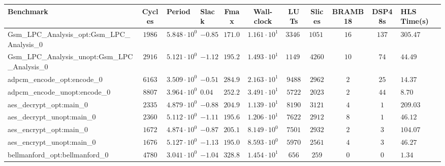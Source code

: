 \begin{tabular}{|l|c|HHc|c|c|c|c|cH|}
\hline
Benchmark                                       & Cycles       & Period                 & Slack     & Fmax       & Wall-clock              & LUTs       & Slices    & BRAMB18 & DSP48s  & HLS Time(s) \\
\hline
Gsm\_LPC\_Analysis\_opt:Gsm\_LPC\_Analysis\_0   & $ 1986     $ & $ 5.848 \cdot 10^{0} $ & $ -0.85 $ & $ 171.00 $ & $ 1.161 \cdot 10^{1}  $ & $ 33466  $ & $ 10517 $ & $ 16  $ & $ 137 $ & $ 305.47  $ \\
Gsm\_LPC\_Analysis\_unopt:Gsm\_LPC\_Analysis\_0 & $ 2916     $ & $ 5.121 \cdot 10^{0} $ & $ -1.12 $ & $ 195.27 $ & $ 1.493 \cdot 10^{1}  $ & $ 11490  $ & $ 4260  $ & $ 10  $ & $ 74  $ & $ 44.49   $ \\
adpcm\_encode\_opt:encode\_0                    & $ 6163     $ & $ 3.509 \cdot 10^{0} $ & $ -0.51 $ & $ 284.98 $ & $ 2.163 \cdot 10^{1}  $ & $ 9488   $ & $ 2962  $ & $ 2   $ & $ 25  $ & $ 14.37   $ \\
adpcm\_encode\_unopt:encode\_0                  & $ 8807     $ & $ 3.964 \cdot 10^{0} $ & $ 0.04  $ & $ 252.27 $ & $ 3.491 \cdot 10^{1}  $ & $ 5722   $ & $ 2023  $ & $ 2   $ & $ 44  $ & $ 8.70    $ \\
aes\_decrypt\_opt:main\_0                       & $ 2335     $ & $ 4.879 \cdot 10^{0} $ & $ -0.88 $ & $ 204.96 $ & $ 1.139 \cdot 10^{1}  $ & $ 8190   $ & $ 3121  $ & $ 4   $ & $ 1   $ & $ 209.03  $ \\
aes\_decrypt\_unopt:main\_0                     & $ 2360     $ & $ 5.112 \cdot 10^{0} $ & $ -1.11 $ & $ 195.62 $ & $ 1.206 \cdot 10^{1}  $ & $ 7622   $ & $ 2912  $ & $ 8   $ & $ 1   $ & $ 46.12   $ \\
aes\_encrypt\_opt:main\_0                       & $ 1672     $ & $ 4.874 \cdot 10^{0} $ & $ -0.87 $ & $ 205.17 $ & $ 8.149 \cdot 10^{0}  $ & $ 7501   $ & $ 2932  $ & $ 2   $ & $ 3   $ & $ 104.07  $ \\
aes\_encrypt\_unopt:main\_0                     & $ 1676     $ & $ 5.127 \cdot 10^{0} $ & $ -1.13 $ & $ 195.05 $ & $ 8.593 \cdot 10^{0}  $ & $ 5970   $ & $ 2561  $ & $ 4   $ & $ 3   $ & $ 46.27   $ \\
bellmanford\_opt:bellmanford\_0                 & $ 4780     $ & $ 3.041 \cdot 10^{0} $ & $ -1.04 $ & $ 328.84 $ & $ 1.454 \cdot 10^{1}  $ & $ 656    $ & $ 259   $ & $ 0   $ & $ 0   $ & $ 1.34    $ \\

\end{tabular}
